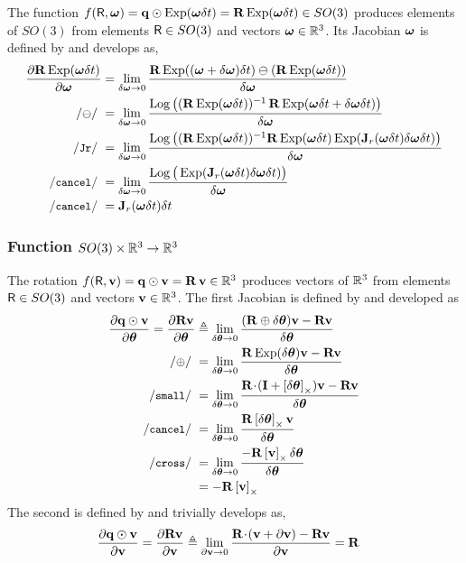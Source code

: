 The function $f(\mathsf R,{{\bm \omega}}) = {\bf q}\odot\operatorname*{Exp}({{\bm \omega}}\delta t) = {\bf R}\operatorname*{Exp}({{\bm \omega}}\delta t)\in SO(3)$ produces elements of $SO(3)$ from elements $\mathsf R\in SO(3)$ and vectors ${{\bm \omega}}\in{\mathbb R}^3$. 
Its Jacobian \wrt ${{\bm \omega}}$ is defined by  and develops as,
%
\begin{align*}
\dpar{\bfR\Exp(\bw\dt)}{\bw} 
&= \lim_{\delta\bw\to0}\frac{\bfR\Exp((\bw+\delta\bw)\dt) \ominus (\bfR\Exp(\bw\dt)) }{\delta\bw} \\
\com{$\ominus$}
&= \lim_{\delta\bw\to0}\frac{\Log\big((\bfR\Exp(\bw\dt))\inv \, \bfR\Exp(\bw\dt+\delta\bw\dt)\big)}{\delta\bw} \\
\cJr
&= \lim_{\delta\bw\to0}\frac{\Log\big((\bfR\Exp(\bw\dt))\inv \bfR\Exp(\bw\dt)\Exp(\bfJ_r(\bw\dt)\delta\bw\dt)\big)}{\delta\bw} \\
\ccancel
&= \lim_{\delta\bw\to0}\frac{\Log\big(\Exp(\bfJ_r(\bw\dt)\delta\bw\dt)\big)}{\delta\bw} \\
\com{cancel}
&= \bfJ_r(\bw\dt)\dt
\end{align*}
%


\subsubsection{Function $SO(3)\times{\mathbb R}^3\to{\mathbb R}^3$} 
\label{sec:jac_SO3xR3toR3}

The rotation $f(\mathsf R,{\bf v}) = {\bf q}\odot{\bf v} = {\bf R}\,{\bf v} \in {\mathbb R}^3$ produces vectors of ${\mathbb R}^3$ from elements $\mathsf R\in SO(3)$ and vectors ${\bf v}\in{\mathbb R}^3$. The first Jacobian is defined by  and developed as
%
\begin{align*}
\dpar{\bfq\od\bfv}{\bth} = \dpar{\bfR\bfv}{\bth} 
&\te \lim_{\delta\bth\to0}\frac{(\bfR\oplus\delta\bth)\bfv-\bfR\bfv}{\delta\bth} \\
\com{$\oplus$}
&= \lim_{\delta\bth\to0}\frac{\bfR\Exp(\delta\bth)\bfv-\bfR\bfv}{\delta\bth} \\
\csmall
&= \lim_{\delta\bth\to0}\frac{\bfR\tdot(\bfI+\hatx{\delta\bth})\bfv-\bfR\bfv}{\delta\bth} \\
\ccancel
&= \lim_{\delta\bth\to0}\frac{\bfR\hatx{\delta\bth}\bfv}{\delta\bth} \\
\ccross
&= \lim_{\delta\bth\to0}\frac{-\bfR\hatx{\bfv}\delta\bth}{\delta\bth} \\
&= -\bfR\hatx{\bfv} 
\end{align*}
%
The second  is defined by  and trivially develops as,
%
\begin{align*}
\frac{\partial{\bf q}\odot{\bf v}}{\partial{\bf v}} = \frac{\partial{\bf R}{\bf v}}{\partial{\bf v}} 
&\triangleq \lim_{\partial{\bf v}\to0}\frac{{\bf R}\!\cdot\!({\bf v}+\partial{\bf v})-{\bf R}{\bf v}}{\partial{\bf v}} 
= {\bf R}
\end{align*}





